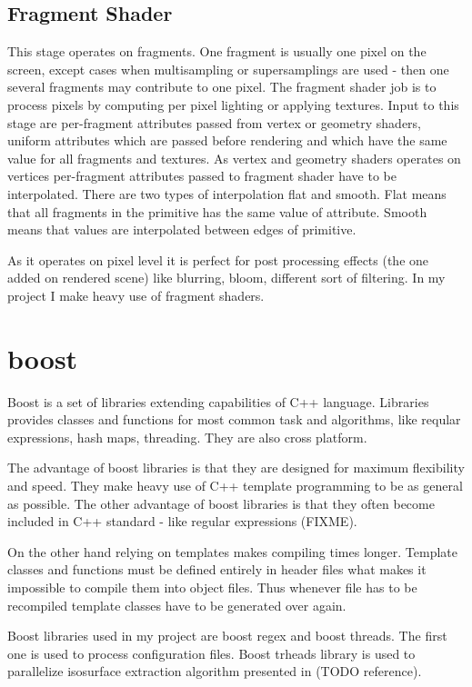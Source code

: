 \subsection{Fragment Shader}
This stage operates on fragments. One fragment is usually one pixel on the screen, except cases when multisampling or supersamplings are used - then one several fragments may contribute to one pixel. The fragment shader job is to process pixels by computing per pixel lighting or applying textures. Input to this stage are per-fragment attributes passed from vertex or geometry shaders, uniform attributes which are passed before rendering and which have the same value for all fragments and textures. As vertex and geometry shaders operates on vertices per-fragment attributes passed to fragment shader have to be interpolated. There are two types of interpolation flat and smooth. Flat means that all fragments in the primitive has the same value of attribute. Smooth means that values are interpolated between edges of primitive. 

As it operates on pixel level it is perfect for post processing effects (the one added on rendered scene) like blurring, bloom, different sort of filtering. In my project I make heavy use of fragment shaders. 

\section{boost}
Boost is a set of libraries extending capabilities of C++ language. Libraries provides classes and functions for most common task and algorithms, like reqular expressions, hash maps, threading. They are also cross platform. 

The advantage of boost libraries is that they are designed for maximum flexibility and speed. They make heavy use of C++ template programming to be as general as possible. The other advantage of boost libraries is that they often become included in C++ standard - like regular expressions (FIXME). 

On the other hand relying on templates makes compiling times longer. Template classes and functions must be defined entirely in header files what makes it impossible to compile them into object files. Thus whenever file has to be recompiled template classes have to be generated over again.

Boost libraries used in my project are boost regex and boost threads. The first one is used to process configuration files. Boost trheads library is used to parallelize isosurface extraction algorithm presented in (TODO reference).


